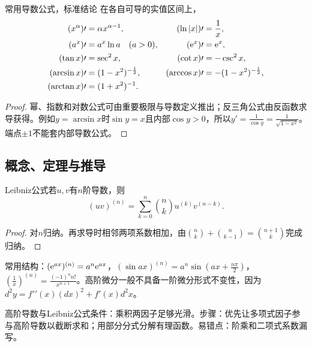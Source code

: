 \begin{theorem}{常用导数公式，标准结论}
在各自可导的实值区间上，
\begin{align*}
(x^\alpha)\prime&=\alpha x^{\alpha-1},& (\ln|x|)\prime&=\dfrac{1}{x},\\
(a^x)\prime&=a^x\ln a\quad(a>0),& (\mathrm{e}^x)\prime&=\mathrm{e}^x,\\
(\tan x)\prime&=\sec^2x,&(\cot x)\prime&=-\csc^2x,\\
(\arcsin x)\prime&=(1-x^2)^{-\frac{1}{2}},&(\arccos x)\prime&=-(1-x^2)^{-\frac{1}{2}},\\
(\arctan x)\prime&=(1+x^2)^{-1}.&&
\end{align*}
\end{theorem}
\begin{proof}幂、指数和对数公式可由重要极限与导数定义推出；反三角公式由反函数求导获得。例如$y=\arcsin x$时$\sin y=x$且内部$\cos y>0$，所以$y\prime=\frac{1}{\cos y}=\frac{1}{\sqrt{1-x^2}}$。端点$\pm1$不能套内部导数公式。\end{proof}

\subsection{概念、定理与推导}

\begin{theorem}{Leibniz公式}若$u,v$有$n$阶导数，则
\begin{equation}(uv)^{(n)}=\sum_{k=0}^{n}\binom nk u^{(k)}v^{(n-k)}.\end{equation}
\end{theorem}
\begin{proof}对$n$归纳。再求导时相邻两项系数相加，由$\binom nk+\binom n{k-1}=\binom{n+1}k$完成归纳。\end{proof}
常用结构：$(\mathrm{e}^{ax})^{(n)}=a^n\mathrm{e}^{ax}$，$(\sin ax)^{(n)}=a^n\sin(ax+\frac{n\pi}{2})$，$(\frac{1}{x})^{(n)}=\frac{(-1)^n n!}{x^{n+1}}$。高阶微分一般不具备一阶微分形式不变性，因为$d^2y=f\prime\prime(x)(dx)^2+f\prime(x)d^2x$。

\begin{method}{高阶导数与Leibniz公式}条件：乘积两因子足够光滑。步骤：优先让多项式因子参与高阶导数以截断求和；用部分分式分解有理函数。易错点：阶乘和二项式系数漏写。\end{method}
